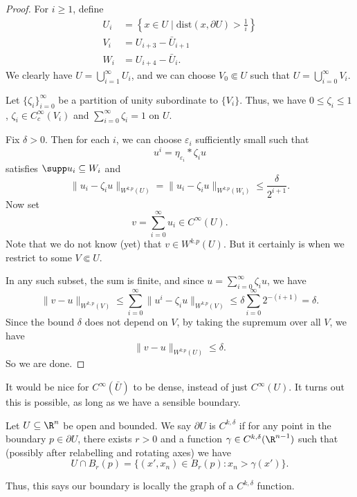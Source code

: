 \documentclass[a4paper]{article}
\begin{document}
\begin{proof}
  For $i \geq 1$, define
  \begin{align*}
    U_i &= \left\{x \in U \mid \mathrm{dist}(x, \partial U) > \tfrac{1}{i}\right\}\\
    V_i &= U_{i + 3} - \bar{U}_{i + 1}\\
    W_i &= U_{i + 4} - \bar{U}_i.
  \end{align*}
  We clearly have $U = \bigcup_{i = 1}^\infty U_i$, and we can choose $V_0 \Subset U$ such that $U = \bigcup_{i = 0}^\infty V_i$.

  Let $\{\zeta_i\}_{i = 0}^\infty$ be a partition of unity subordinate to $\{V_i\}$. Thus, we have $0 \leq \zeta_i \leq 1$, $\zeta_i \in C_c^\infty(V_i)$ and $\sum_{i = 0}^\infty \zeta_i = 1$ on $U$.

  Fix $\delta > 0$. Then for each $i$, we can choose $\varepsilon_i$ sufficiently small such that
  \[
    u^i = \eta_{\varepsilon_i} * \zeta_i u
  \]
  satisfies $\supp u_i \subseteq W_i$ and
  \[
    \|u_i - \zeta_i u\|_{W^{k. p}(U)} = \|u_i - \zeta_i u\|_{W^{k. p}(W_i)} \leq \frac{\delta}{2^{i + 1}}.
  \]
  Now set
  \[
    v = \sum_{i = 0}^\infty u_i \in C^\infty(U).
  \]
  Note that we do not know (yet) that $v \in W^{k. p}(U)$. But it certainly is when we restrict to some $V \Subset U$.

  In any such subset, the sum is finite, and since $u = \sum_{i = 0}^\infty \zeta_i u$, we have
  \[
    \|v - u\|_{W^{k, p}(V)} \leq \sum_{i = 0}^\infty \|u^i - \zeta_i u\|_{W^{k. p}(V)} \leq \delta \sum_{i = 0}^\infty 2^{-(i + 1)} = \delta.
  \]
  Since the bound $\delta$ does not depend on $V$, by taking the supremum over all $V$, we have
  \[
    \|v - u\|_{W^{k. p}(U)} \leq \delta.
  \]
  So we are done.
\end{proof}

It would be nice for $C^\infty(\bar{U})$ to be dense, instead of just $C^\infty(U)$. It turns out this is possible, as long as we have a sensible boundary.

\begin{defi}
  Let $U \subseteq \R^n$ be open and bounded. We say $\partial U$ is $C^{k, \delta}$ if for any point in the boundary $p \in \partial U$, there exists $r > 0$ and a function $\gamma \in C^{k, \delta}(\R^{n - 1})$ such that (possibly after relabelling and rotating axes) we have
  \[
    U \cap B_r(p) = \{(x', x_n) \in B_r(p): x_n > \gamma(x')\}.
  \]
\end{defi}
Thus, this says our boundary is locally the graph of a $C^{k, \delta}$ function.
\end{document}
